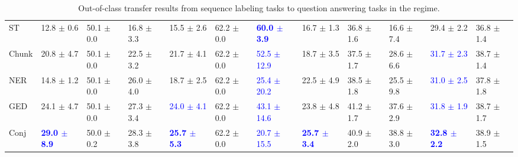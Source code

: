 \begin{landscape}
\begin{table}[t]
\begin{adjustbox}{max width=2\textwidth}
\begin{tabular}{ l l l l l  l l l l  l l l }
ST & 12.8 $\pm$ 0.6 & 50.1 $\pm$ 0.0 & 16.8 $\pm$ 3.3 & 15.5 $\pm$ 2.6 & 62.2 $\pm$ 0.0 & \textbf{\textcolor{blue}{60.0 $\pm$ 3.9}} & 16.7 $\pm$ 1.3 & 36.8 $\pm$ 1.6 & 16.6 $\pm$ 7.4 & 29.4 $\pm$ 2.2 & 36.8 $\pm$ 1.4\\
Chunk & 20.8 $\pm$ 4.7 & 50.1 $\pm$ 0.0 & 22.5 $\pm$ 3.2 & 21.7 $\pm$ 4.1 & 62.2 $\pm$ 0.0 & \textcolor{blue}{52.5 $\pm$ 12.9} & 18.7 $\pm$ 3.5 & 37.5 $\pm$ 1.7 & 28.6 $\pm$ 6.6 & \textcolor{blue}{31.7 $\pm$ 2.3} & 38.7 $\pm$ 1.4\\
NER & 14.8 $\pm$ 1.2 & 50.1 $\pm$ 0.0 & 26.0 $\pm$ 4.0 & 18.7 $\pm$ 2.5 & 62.2 $\pm$ 0.0 & \textcolor{blue}{25.4 $\pm$ 20.2} & 22.5 $\pm$ 4.9 & 38.5 $\pm$ 1.8 & 25.5 $\pm$ 9.8 & \textcolor{blue}{31.0 $\pm$ 2.5} & 37.8 $\pm$ 1.8\\
GED & 24.1 $\pm$ 4.7 & 50.1 $\pm$ 0.0 & 27.3 $\pm$ 3.4 & \textcolor{blue}{24.0 $\pm$ 4.1} & 62.2 $\pm$ 0.0 & \textcolor{blue}{43.1 $\pm$ 14.6} & 23.8 $\pm$ 4.8 & 41.2 $\pm$ 1.7 & 37.6 $\pm$ 2.9 & \textcolor{blue}{31.8 $\pm$ 1.9} & 38.7 $\pm$ 1.7\\
Conj & \textbf{\textcolor{blue}{29.0 $\pm$ 8.9}} & 50.0 $\pm$ 0.2 & 28.3 $\pm$ 3.8 & \textbf{\textcolor{blue}{25.7 $\pm$ 5.3}} & 62.2 $\pm$ 0.0 & \textcolor{blue}{20.7 $\pm$ 15.5} & \textbf{\textcolor{blue}{25.7 $\pm$ 3.4}} & 40.9 $\pm$ 2.0 & 38.8 $\pm$ 3.0 & \textbf{\textcolor{blue}{32.8 $\pm$ 2.2}} & 38.9 $\pm$ 1.5\\
\bottomrule
\end{tabular}
\end{adjustbox}
\caption{Out-of-class transfer results from sequence labeling tasks to question answering tasks in the  regime.}
\label{tbla10b}
\end{table}
\end{landscape}
